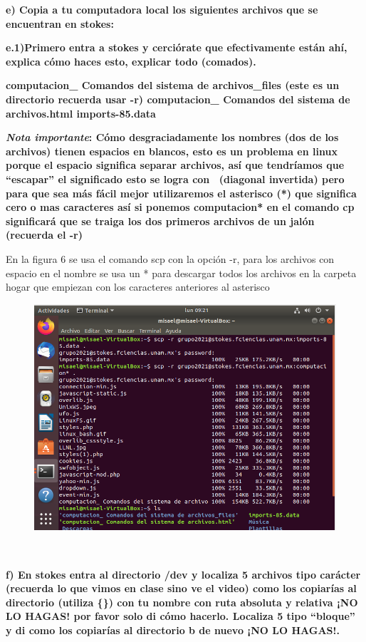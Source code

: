 \documentclass[12pt,a4paper]{article}
\begin{document}
\noindent \textbf{e) Copia a tu computadora local los siguientes archivos que se encuentran en stokes:}

\noindent \textbf{e.1)Primero entra a stokes y cerciórate que efectivamente están ahí, explica cómo haces
esto, explicar todo (comados).}

\noindent \textbf{computacion\_ Comandos del sistema de archivos\_files (este es un directorio recuerda usar -r) computacion\_ Comandos del sistema de archivos.html imports-85.data}


\noindent \textbf{\emph{Nota importante}: Cómo desgraciadamente los nombres (dos de los archivos) tienen espacios en blancos, esto es un problema en linux porque el espacio significa separar archivos, así que
tendríamos que “escapar” el significado esto se logra con \ (diagonal invertida) pero para que
sea más fácil mejor utilizaremos el asterisco (*) que significa cero o mas caracteres así si
ponemos computacion* en el comando cp significará que se traiga los dos primeros archivos
de un jalón (recuerda el -r)}

\noindent En la figura 6 se usa el comando scp con la opción -r, para los archivos con espacio en el nombre se usa un * para descargar todos los archivos en la carpeta hogar que empiezan con los caracteres anteriores al asterisco
\begin{figure}[h!]
    \centering
    \includegraphics[scale = 0.5]{e.1.png}
    \caption{}
\end{figure}
\\
\newpage

\noindent \textbf{f) En stokes entra al directorio /dev y localiza 5 archivos tipo carácter (recuerda lo que vimos en clase sino ve el video) como los copiarías al directorio (utiliza \{\}) con tu nombre con ruta absoluta y relativa ¡NO LO HAGAS! por favor solo di cómo hacerlo. Localiza 5 tipo “bloque” y di como los copiarías al directorio b de nuevo ¡NO LO HAGAS!.}
\end{document}
